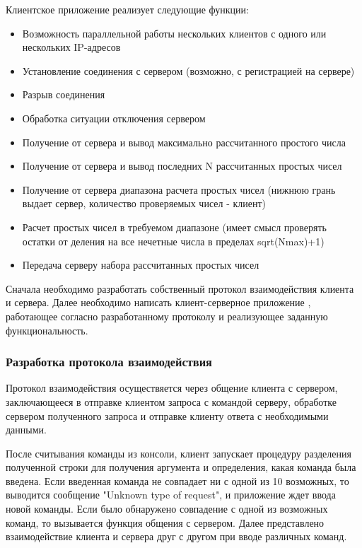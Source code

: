 Клиентское приложение реализует следующие функции:

\begin{itemize}
	\item Возможность параллельной работы нескольких клиентов с одного
	или нескольких IP-адресов
	\item Установление соединения с сервером (возможно, с регистрацией на
	сервере)
	\item Разрыв соединения
	\item Обработка ситуации отключения сервером
	\item Получение от сервера и вывод максимально рассчитанного простого
	числа
	\item Получение от сервера и вывод последних N рассчитанных простых
	чисел
	\item Получение от сервера диапазона расчета простых чисел (нижнюю
	грань выдает сервер, количество проверяемых чисел - клиент)
	\item Расчет простых чисел в требуемом диапазоне (имеет смысл проверять остатки от деления на все нечетные числа в пределах
	sqrt(Nmax)+1)
	\item Передача серверу набора рассчитанных простых чисел
\end{itemize}

Сначала необходимо разработать собственный протокол взаимодействия клиента и сервера. Далее необходимо написать клиент-серверное приложение , работающее согласно разработанному протоколу и реализующее заданную функциональность.
\subsubsection{Разработка протокола взаимодействия}

Протокол взаимодействия осуществяется через общение клиента с сервером, заключающееся в отправке клиентом запроса с командой серверу, обработке сервером полученного запроса и отправке клиенту ответа с необходимыми данными.

После считывания команды из консоли, клиент запускает процедуру разделения полученной строки для получения аргумента и определения, какая команда была введена. Если введенная команда не совпадает ни с одной из 10 возможных, то выводится сообщение "Unknown type of request", и приложение ждет ввода новой команды. Если было обнаружено совпадение с одной из возможных команд, то вызывается функция общения с сервером. Далее представлено взаимодействие клиента и сервера друг с другом при вводе различных команд.

